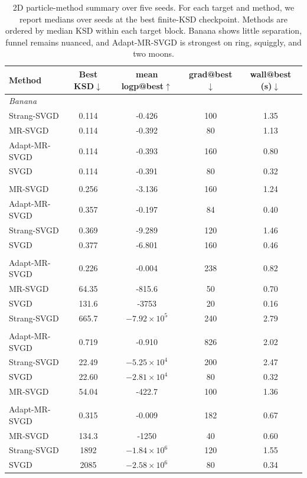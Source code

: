 \begin{table}[t]
  \centering
  \scriptsize
  \setlength{\tabcolsep}{4pt}
  \begin{tabular}{lcccc}
    \toprule
    Method & Best KSD$\downarrow$ & mean logp@best$\uparrow$ & grad@best$\downarrow$ & wall@best (s)$\downarrow$ \\
    \midrule
    \multicolumn{5}{l}{\textit{Banana}} \\
    Strang-SVGD & 0.114 & -0.426 & 100 & 1.35 \\
    MR-SVGD & 0.114 & -0.392 & 80 & 1.13 \\
    Adapt-MR-SVGD & 0.114 & -0.393 & 160 & 0.80 \\
    SVGD & 0.114 & -0.391 & 80 & 0.32 \\
    \addlinespace[0.3em]
    \multicolumn{5}{l}{\textit{Funnel}} \\
    MR-SVGD & 0.256 & -3.136 & 160 & 1.24 \\
    Adapt-MR-SVGD & 0.357 & -0.197 & 84 & 0.40 \\
    Strang-SVGD & 0.369 & -9.289 & 120 & 1.46 \\
    SVGD & 0.377 & -6.801 & 160 & 0.46 \\
    \addlinespace[0.3em]
    \multicolumn{5}{l}{\textit{Ring}} \\
    Adapt-MR-SVGD & 0.226 & -0.004 & 238 & 0.82 \\
    MR-SVGD & 64.35 & -815.6 & 50 & 0.70 \\
    SVGD & 131.6 & -3753 & 20 & 0.16 \\
    Strang-SVGD & 665.7 & $-7.92\times 10^5$ & 240 & 2.79 \\
    \addlinespace[0.3em]
    \multicolumn{5}{l}{\textit{Squiggly}} \\
    Adapt-MR-SVGD & 0.719 & -0.910 & 826 & 2.02 \\
    Strang-SVGD & 22.49 & $-5.25\times 10^4$ & 200 & 2.47 \\
    SVGD & 22.60 & $-2.81\times 10^4$ & 80 & 0.32 \\
    MR-SVGD & 54.04 & -422.7 & 100 & 1.36 \\
    \addlinespace[0.3em]
    \multicolumn{5}{l}{\textit{Two moons}} \\
    Adapt-MR-SVGD & 0.315 & -0.009 & 182 & 0.67 \\
    MR-SVGD & 134.3 & -1250 & 40 & 0.60 \\
    Strang-SVGD & 1892 & $-1.84\times 10^6$ & 120 & 1.55 \\
    SVGD & 2085 & $-2.58\times 10^6$ & 80 & 0.34 \\
    \bottomrule
  \end{tabular}
  \caption{2D particle-method summary over five seeds. For each target and
  method, we report medians over seeds at the best finite-KSD checkpoint.
  Methods are ordered by median KSD within each target block. Banana shows
  little separation, funnel remains nuanced, and Adapt-MR-SVGD is strongest on
  ring, squiggly, and two moons.}
  \label{tab:2d_summary}
\end{table}

